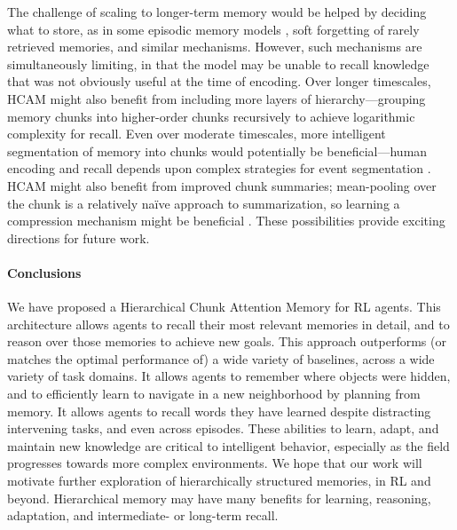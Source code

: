 \documentclass{article}
\begin{document}
The challenge of scaling to longer-term memory would be helped by deciding what to store, as in some episodic memory models \citep{graves2016hybrid}, soft forgetting of rarely retrieved memories, and similar mechanisms. However, such mechanisms are simultaneously limiting, in that the model may be unable to recall knowledge that was not obviously useful at the time of encoding. Over longer timescales, HCAM might also benefit from including more layers of hierarchy---grouping memory chunks into higher-order chunks recursively to achieve logarithmic complexity for recall. Even over moderate timescales, more intelligent segmentation of memory into chunks would potentially be beneficial---human encoding and recall depends upon complex strategies for event segmentation \citep{zacks2007event,sols2017event,chan2017lingering,lu2020learning,chang2021relating}. HCAM might also benefit from improved chunk summaries; mean-pooling over the chunk is a relatively na\"{i}ve approach to summarization, so learning a compression mechanism might be beneficial \citep{rae2019compressive}. These possibilities provide exciting directions for future work. \vspace{-0.5em}


\paragraph{Conclusions}

We have proposed a Hierarchical Chunk Attention Memory for RL agents. This architecture allows agents to recall their most relevant memories in detail, and to reason over those memories to achieve new goals. This approach outperforms (or matches the optimal performance of) a wide variety of baselines, across a wide variety of task domains. It allows agents to remember where objects were hidden, and to efficiently learn to navigate in a new neighborhood by planning from memory. It allows agents to recall words they have learned despite distracting intervening tasks, and even across episodes. These abilities to learn, adapt, and maintain new knowledge are critical to intelligent behavior, especially as the field progresses towards more complex environments. We hope that our work will motivate further exploration of hierarchically structured memories, in RL and beyond. Hierarchical memory may have many benefits for learning, reasoning, adaptation, and intermediate- or long-term recall.  
\end{document}
